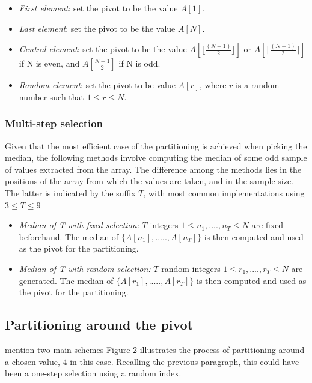 \documentclass[]{finalproject}
\begin{document}
\begin{itemize}
\item{\textit{First element}}: set the pivot to be the value $A[1]$.
\item{\textit{Last element}}: set the pivot to be the value $A[N]$.
\item{\textit{Central element}}: set the pivot to be the value $A[\lfloor \frac{(N+1)}{2} \rfloor]$ or $A[\lceil \frac{(N+1)}{2} \rceil]$ if N is even, and $A[\frac{N+1}{2}]$ if N is odd.
\item{\textit{Random element}}: set the pivot to be value $A[r]$, where $r$ is a random number such that $1 \leq r \leq N$.
\end{itemize}

\subsubsection{Multi-step selection}
Given that the most efficient case of the partitioning is achieved when picking the median, the following methods involve computing the median of some odd sample of values extracted from the array. The difference among the methods lies in the positions of the array from which the values are taken, and in the sample size. The latter is indicated by the suffix $T$, with most common implementations using $3 \leq T \leq 9$

\begin{itemize}
\item{\textit{Median-of-T with fixed selection:}} $T$ integers $1 \leq n_{1},....,n_{T} \leq N$ are fixed beforehand. The median of $\{A[n_{1}],.....,A[n_{T}]\}$ is then computed and used as the pivot for the partitioning.
\item{\textit{Median-of-T with random selection:}} $T$ random integers $1 \leq r_{1},....,r_{T} \leq N$ are generated. The median of $\{A[r_{1}],.....,A[r_{T}]\}$ is then computed and used as the pivot for the partitioning.
\end{itemize}

\subsection{Partitioning around the pivot}
mention two main schemes
Figure 2 illustrates the process of partitioning around a chosen value, 4 in this case. Recalling the previous paragraph, this could have been a one-step selection using a random index.
\end{document}
